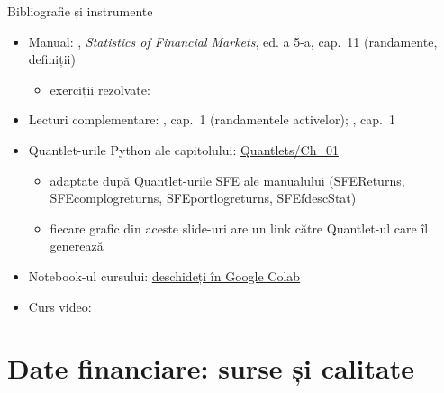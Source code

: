 \begin{frame}{Bibliografie și instrumente}
\itemsize{\small}
\begin{itemize}
    \item Manual: , \textit{Statistics of Financial Markets}, ed. a 5-a, cap.~11 (randamente, definiții)
    \begin{itemize}
        \item exerciții rezolvate: 
    \end{itemize}
    \item Lecturi complementare: , cap.~1 (randamentele activelor); , cap.~1
    \item Quantlet-urile Python ale capitolului: \href{https://github.com/danpele/SFM/tree/main/Quantlets/Ch_01}{Quantlets/Ch\_01}
    \begin{itemize}
        \item adaptate după Quantlet-urile SFE ale manualului (SFEReturns, SFEcomplogreturns, SFEportlogreturns, SFEfdescStat)
        \item fiecare grafic din aceste slide-uri are un link către Quantlet-ul care îl generează
    \end{itemize}
    \item Notebook-ul cursului: \href{\colaburl{notebooks/EN/chapter1_lecture_notebook.ipynb}}{deschideți în Google Colab}
    \item Curs video: 
\end{itemize}
\end{frame}


\section{Date financiare: surse și calitate}

